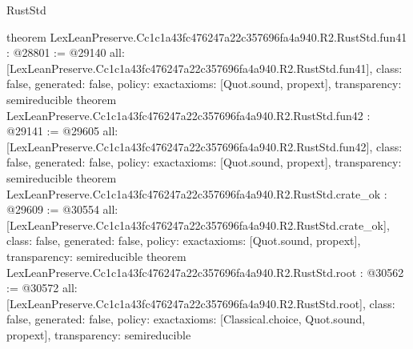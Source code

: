 \begin{lexlean}{RustStd}
\begin{coremodule}
{}
theorem LexLeanPreserve.Cc1c1a43fc476247a22c357696fa4a940.R2.RustStd.fun41 : @28801 := @29140 {
  all: [LexLeanPreserve.Cc1c1a43fc476247a22c357696fa4a940.R2.RustStd.fun41],
  class: false,
  generated: false,
  policy: exact{axioms: [Quot.sound, propext]},
  transparency: semireducible
}
theorem LexLeanPreserve.Cc1c1a43fc476247a22c357696fa4a940.R2.RustStd.fun42 : @29141 := @29605 {
  all: [LexLeanPreserve.Cc1c1a43fc476247a22c357696fa4a940.R2.RustStd.fun42],
  class: false,
  generated: false,
  policy: exact{axioms: [Quot.sound, propext]},
  transparency: semireducible
}
theorem LexLeanPreserve.Cc1c1a43fc476247a22c357696fa4a940.R2.RustStd.crate_ok : @29609 := @30554 {
  all: [LexLeanPreserve.Cc1c1a43fc476247a22c357696fa4a940.R2.RustStd.crate_ok],
  class: false,
  generated: false,
  policy: exact{axioms: [Quot.sound, propext]},
  transparency: semireducible
}
theorem LexLeanPreserve.Cc1c1a43fc476247a22c357696fa4a940.R2.RustStd.root : @30562 := @30572 {
  all: [LexLeanPreserve.Cc1c1a43fc476247a22c357696fa4a940.R2.RustStd.root],
  class: false,
  generated: false,
  policy: exact{axioms: [Classical.choice, Quot.sound, propext]},
  transparency: semireducible
}


\end{coremodule}
\end{lexlean}
